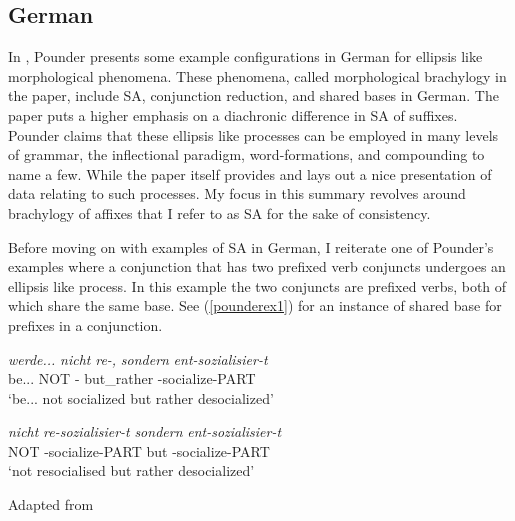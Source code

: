 \subsection{German}

In \cite{pounder2006broken}, Pounder presents some example configurations in German for ellipsis like morphological phenomena. These phenomena, called morphological brachylogy in the paper, include SA, conjunction reduction, and shared bases in German. The paper puts a higher emphasis on a diachronic difference in SA of suffixes. Pounder claims that these ellipsis like processes can be employed in many levels of grammar, the inflectional paradigm, word-formations, and compounding to name a few. While the paper itself provides and lays out a nice presentation of data relating to such processes. My focus in this summary revolves around brachylogy of affixes that I refer to as SA for the sake of consistency.

Before moving on with examples of SA in German, I reiterate one of Pounder's examples where a conjunction that has two prefixed verb conjuncts undergoes an ellipsis like process. In this example the two conjuncts are prefixed verbs, both of which share the same base. See (\ref{pounderex1}) for an instance of shared base for prefixes in a conjunction. 

\begin{exe}
    \ex \label{pounderex1}
    \begin{xlist}
        \ex \label{pounderex1a} 
        \gll 
        \textit{werde...} \textit{nicht} \textit{re-,} \textit{sondern} \textit{ent-sozialisier-t} \\ be... NOT {\Pref}- but\_rather {\Pref}-socialize-PART \\
        \glt `be... not socialized but rather desocialized'
    
        \ex \label{pounderex1b}
        \gll 
        \textit{nicht} \textit{re-sozialisier-t} \textit{sondern} \textit{ent-sozialisier-t} \\ NOT {\Pref}-socialize-PART but {\Pref}-socialize-PART \\
        \glt `not resocialised but rather desocialized'
    \end{xlist}
\hfill Adapted from \cite{pounder2006broken}
\end{exe}

